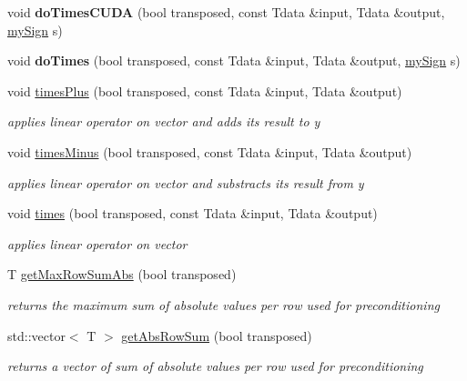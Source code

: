 \begin{DoxyCompactItemize}
void {\bfseries do\+Times\+C\+U\+DA} (bool transposed, const Tdata \&input, Tdata \&output, \hyperlink{tools_8h_ab8be8fa992a31c15058261e81ef8ba9d}{my\+Sign} s)
\item 
\mbox{\label{classflex_gradient_operator_a75d702d6d1cc0fce5d5c45c2294aba59}} 
void {\bfseries do\+Times} (bool transposed, const Tdata \&input, Tdata \&output, \hyperlink{tools_8h_ab8be8fa992a31c15058261e81ef8ba9d}{my\+Sign} s)
\item 
void \hyperlink{classflex_gradient_operator_a1b6c9b788e6d5a62ba008811f287f8e5}{times\+Plus} (bool transposed, const Tdata \&input, Tdata \&output)
\begin{DoxyCompactList}\small\item\em applies linear operator on vector and adds its result to y \end{DoxyCompactList}\item 
void \hyperlink{classflex_gradient_operator_a287f5efd41aa14ee61aee87dfed08b88}{times\+Minus} (bool transposed, const Tdata \&input, Tdata \&output)
\begin{DoxyCompactList}\small\item\em applies linear operator on vector and substracts its result from y \end{DoxyCompactList}\item 
void \hyperlink{classflex_gradient_operator_aae5e807f99c3634c52b79f08d72fa7a2}{times} (bool transposed, const Tdata \&input, Tdata \&output)
\begin{DoxyCompactList}\small\item\em applies linear operator on vector \end{DoxyCompactList}\item 
T \hyperlink{classflex_gradient_operator_a6acb61ea8abf404d63be4574976391bb}{get\+Max\+Row\+Sum\+Abs} (bool transposed)
\begin{DoxyCompactList}\small\item\em returns the maximum sum of absolute values per row used for preconditioning \end{DoxyCompactList}\item 
std\+::vector$<$ T $>$ \hyperlink{classflex_gradient_operator_a04950a1e57f7587b95824bfd82b35738}{get\+Abs\+Row\+Sum} (bool transposed)
\begin{DoxyCompactList}\small\item\em returns a vector of sum of absolute values per row used for preconditioning \end{DoxyCompactList}\item 

\end{DoxyCompactItemize}
